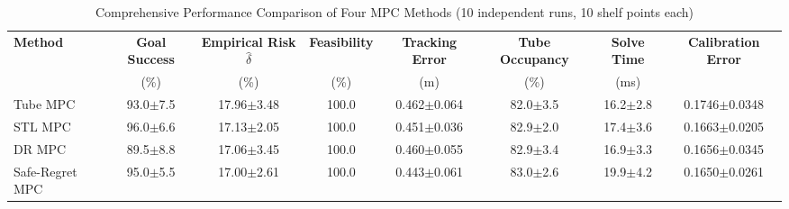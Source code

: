 
\begin{table}[htbp]
\centering
\caption{Comprehensive Performance Comparison of Four MPC Methods (10 independent runs, 10 shelf points each)}
\label{tab:mpc_comparison}
\begin{tabular}{lccccccc}
\toprule
\textbf{Method} & \textbf{Goal Success} & \textbf{Empirical Risk} $\hat{\delta}$ & \textbf{Feasibility} & \textbf{Tracking Error} & \textbf{Tube Occupancy} & \textbf{Solve Time} & \textbf{Calibration Error} \\
 & (\%) & (\%) & (\%) & (m) & (\%) & (ms) & \\
\midrule
Tube MPC & 93.0$\pm$7.5 & 17.96$\pm$3.48 & 100.0 & 0.462$\pm$0.064 & 82.0$\pm$3.5 & 16.2$\pm$2.8 & 0.1746$\pm$0.0348 \\
STL MPC & 96.0$\pm$6.6 & 17.13$\pm$2.05 & 100.0 & 0.451$\pm$0.036 & 82.9$\pm$2.0 & 17.4$\pm$3.6 & 0.1663$\pm$0.0205 \\
DR MPC & 89.5$\pm$8.8 & 17.06$\pm$3.45 & 100.0 & 0.460$\pm$0.055 & 82.9$\pm$3.4 & 16.9$\pm$3.3 & 0.1656$\pm$0.0345 \\
Safe-Regret MPC & 95.0$\pm$5.5 & 17.00$\pm$2.61 & 100.0 & 0.443$\pm$0.061 & 83.0$\pm$2.6 & 19.9$\pm$4.2 & 0.1650$\pm$0.0261 \\
\bottomrule
\end{tabular}
\end{table}
